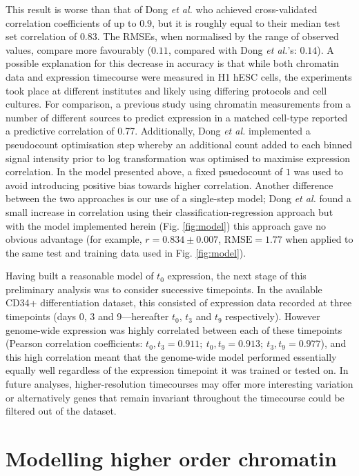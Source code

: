 \documentclass[a4paper,11pt,oneside]{book}
\begin{document}
This result is worse than that of Dong \emph{et al.}
who achieved cross-validated correlation coefficients of up to $0.9$,
but it is roughly equal to their median test set correlation of
$0.83$.\cite{Dong2012} The RMSEs, when normalised by the range of
observed values, compare more favourably ($0.11$, compared with Dong \emph{et al.}'s: $0.14$). A possible explanation for this decrease in
accuracy is that while both chromatin data and expression timecourse
were measured in H1 hESC cells, the experiments took place at
different institutes and likely using differing protocols and cell cultures. For comparison, a previous study using chromatin
measurements from a number of different sources to predict expression
in a matched cell-type reported a predictive correlation of 0.77.\cite{Karlic2010} Additionally, Dong \emph{et al.} implemented a pseudocount
optimisation step whereby an additional count added to each binned signal
intensity prior to log transformation was optimised to maximise
expression correlation. In the model presented above, a fixed
psuedocount of $1$ was used to avoid introducing positive bias towards
higher correlation. Another difference between the two approaches is
our use of a single-step model; Dong \emph{et al.} found a small
increase in correlation using their classification-regression approach
but with the model implemented herein (Fig. \ref{fig:model}) this approach gave no obvious advantage (for
example, $r
= 0.834 \pm 0.007$, $\textrm{RMSE} = 1.77$ when applied to the same test and
training data used in Fig. \ref{fig:model}).

Having built a reasonable model of $t_0$ expression, the next stage of
this preliminary analysis was to consider successive timepoints. In the
available CD34+ differentiation dataset, this consisted of expression
data recorded at three
timepoints (days 0, 3 and 9---hereafter $t_0$, $t_3$ and $t_9$
respectively). However genome-wide expression
was highly correlated between each of these timepoints (Pearson correlation coefficients: $t_0, t_3 = 0.911; ~t_0,t_9 =
0.913; ~t_3,t_9 = 0.977$), and this high correlation meant that the
genome-wide model performed essentially equally well regardless of the
expression timepoint it was trained or tested on. In future analyses, higher-resolution timecourses may offer
more interesting variation or alternatively genes that remain invariant
throughout the timecourse could be filtered out of the dataset. 

\section{Modelling higher order chromatin}
\end{document}
